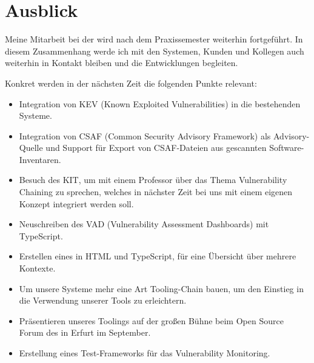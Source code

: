 
\chapter{Ausblick} \label{ch:ausblick}

Meine Mitarbeit bei der {\metaeffekt} wird nach dem Praxissemester weiterhin fortgeführt.
In diesem Zusammenhang werde ich mit den Systemen, Kunden und Kollegen auch weiterhin in Kontakt bleiben und die Entwicklungen begleiten.

Konkret werden in der nächsten Zeit die folgenden Punkte relevant:

\begin{itemize}
    \item Integration von KEV (Known Exploited Vulnerabilities) in die bestehenden Systeme.
    \item Integration von CSAF (Common Security Advisory Framework) als Advisory-Quelle und Support für Export von CSAF-Dateien aus gescannten Software-Inventaren.
    \item Besuch des KIT, um mit einem Professor über das Thema Vulnerability Chaining zu sprechen, welches in nächster Zeit bei uns mit einem eigenen Konzept integriert werden soll.
    \item Neuschreiben des VAD (Vulnerability Assessment Dashboards) mit TypeScript.
    \item Erstellen eines  in HTML und TypeScript, für eine Übersicht über mehrere Kontexte.
    \item Um unsere Systeme mehr eine Art Tooling-Chain bauen, um den Einstieg in die Verwendung unserer Tools zu erleichtern.
    \item Präsentieren unseres Toolings auf der großen Bühne beim Open Source Forum des {\bitkom} in Erfurt im September.
    \item Erstellung eines Test-Frameworks für das Vulnerability Monitoring.
\end{itemize}
